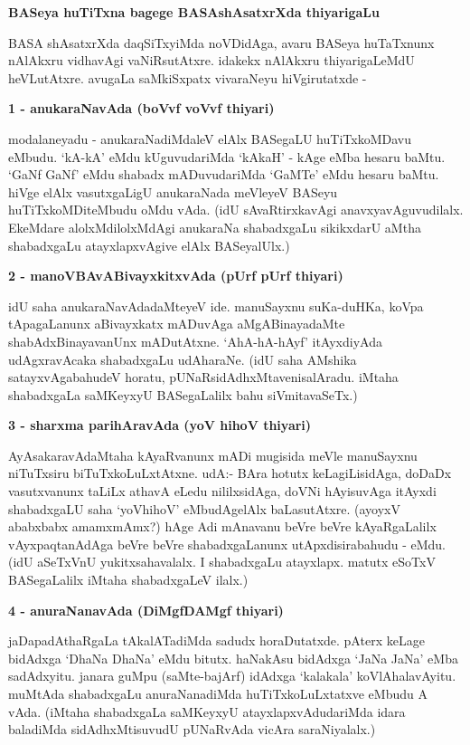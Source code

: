 \noindent
\textbf{BASeya huTiTxna bagege BASAshAsatxrXda thiyarigaLu}\label{page3}

BASA shAsatxrXda daqSiTxyiMda noVDidAga, avaru BASeya huTaTxnunx nAlAkxru vidhavAgi vaNiRsutAtxre. idakekx nAlAkxru thiyarigaLeMdU heVLutAtxre. avugaLa saMkiSxpatx vivaraNeyu hiVgirutatxde -

\noindent
\textbf{1 - anukaraNavAda (boVvf voVvf thiyari)}

modalaneyadu - anukaraNadiMdaleV elAlx BASegaLU huTiTxkoMDavu eMbudu. `kA-kA' eMdu kUguvudariMda `kAkaH' - kAge eMba hesaru baMtu. `GaNf GaNf' eMdu shabadx mADuvudariMda `GaMTe' eMdu hesaru baMtu. hiVge elAlx vasutxgaLigU anukaraNada meVleyeV BASeyu huTiTxkoMDiteMbudu oMdu vAda. (idU sAvaRtirxkavAgi anavxyavAguvudilalx. EkeMdare alolxMdilolxMdAgi anukaraNa shabadxgaLu sikikxdarU aMtha shabadxgaLu atayxlapxvAgive elAlx BASeyalUlx.)

\noindent
\textbf{2 - manoVBAvABivayxkitxvAda (pUrf pUrf thiyari)}

idU saha anukaraNavAdadaMteyeV ide. manuSayxnu suKa-duHKa, koVpa tApagaLanunx aBivayxkatx mADuvAga aMgABinayadaMte shabAdxBinayavanUnx mADutAtxne. `AhA-hA-hAyf' itAyxdiyAda udAgxravAcaka shabadxgaLu udAharaNe. (idU saha AMshika satayxvAgabahudeV horatu, pUNaRsidAdhxMtavenisalAradu. iMtaha shabadxgaLa saMKeyxyU BASegaLalilx bahu siVmitavaSeTx.)

\noindent
\textbf{3 - sharxma parihAravAda (yoV hihoV thiyari)}

AyAsakaravAdaMtaha kAyaRvanunx mADi mugisida meVle manuSayxnu niTuTxsiru biTuTxkoLuLxtAtxne. udA:- BAra hotutx keLagiLisidAga, doDaDx vasutxvanunx taLiLx athavA eLedu nililxsidAga, doVNi hAyisuvAga itAyxdi shabadxgaLU saha `yoVhihoV' eMbudAgelAlx baLasutAtxre. (ayoyxV ababxbabx amamxmAmx?) hAge Adi mAnavanu beVre beVre kAyaRgaLalilx vAyxpaqtanAdAga beVre beVre shabadxgaLanunx utApxdisirabahudu - eMdu. (idU aSeTxVnU yukitxsahavalalx. I shabadxgaLu atayxlapx. matutx eSoTxV BASegaLalilx iMtaha shabadxgaLeV ilalx.)

\noindent
\textbf{4 - anuraNanavAda (DiMgfDAMgf thiyari)}

jaDapadAthaRgaLa tAkalATadiMda sadudx horaDutatxde. pAterx keLage bidAdxga `DhaNa DhaNa' eMdu bitutx. haNakAsu bidAdxga `JaNa JaNa' eMba sadAdxyitu. janara guMpu (saMte-bajArf) idAdxga `kalakala' koVlAhalavAyitu. muMtAda shabadxgaLu anuraNanadiMda huTiTxkoLuLxtatxve eMbudu A vAda. (iMtaha shabadxgaLa saMKeyxyU atayxlapxvAdudariMda idara baladiMda sidAdhxMtisuvudU pUNaRvAda vicAra saraNiyalalx.)

